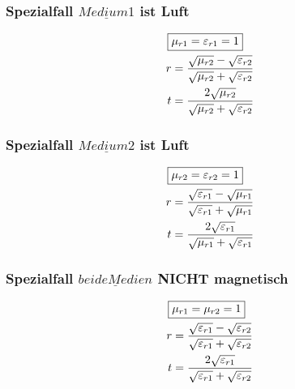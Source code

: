 \subsubsection{Spezialfall $\underline{Medium 1}$ ist Luft}
\begin{align*}
    \Aboxed{ & \mu_{r1} = \varepsilon_{r1} = 1}                                                            \\
    r        & = \frac{\sqrt{\mu_{r2}}-\sqrt{\varepsilon_{r2}}}{{\sqrt{\mu_{r2}}+\sqrt{\varepsilon_{r2}}}} \\
    t        & = \frac{2\sqrt{\mu_{r2}}}{\sqrt{\mu_{r2}}+\sqrt{\varepsilon_{r2}}}
\end{align*}

\subsubsection{Spezialfall $\underline{Medium 2}$ ist Luft}
\begin{align*}
    \Aboxed{ & \mu_{r2} = \varepsilon_{r2} = 1}                                                            \\
    r        & = \frac{\sqrt{\varepsilon_{r1}}-\sqrt{\mu_{r1}}}{{\sqrt{\varepsilon_{r1}}+\sqrt{\mu_{r1}}}} \\
    t        & = \frac{2\sqrt{\varepsilon_{r1}}}{\sqrt{\mu_{r1}}+\sqrt{\varepsilon_{r1}}}
\end{align*}

\subsubsection{Spezialfall $\underline{beide Medien}$ NICHT magnetisch}
\begin{align*}
    \Aboxed{ & \mu_{r1} = \mu_{r2} = 1}                                                                                    \\
    r        & = \frac{\sqrt{\varepsilon_{r1}}-\sqrt{\varepsilon_{r2}}}{{\sqrt{\varepsilon_{r1}}+\sqrt{\varepsilon_{r2}}}} \\
    t        & = \frac{2\sqrt{\varepsilon_{r1}}}{\sqrt{\varepsilon_{r1}}+\sqrt{\varepsilon_{r2}}}
\end{align*}

